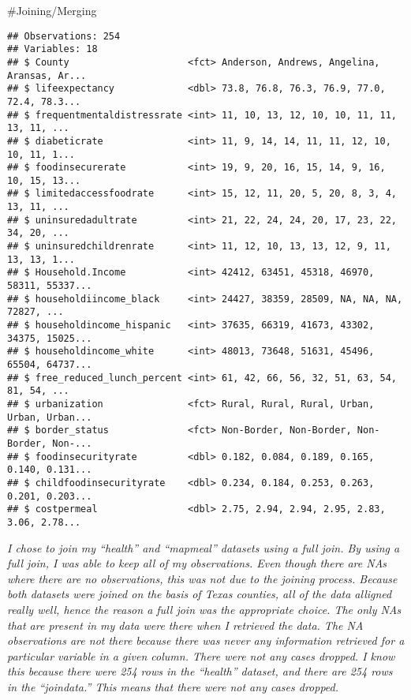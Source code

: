 \documentclass[]{article}
\newenvironment{Shaded}{\begin{snugshade}}{\end{snugshade}}
\newcommand{\DataTypeTok}[1]{\textcolor[rgb]{0.13,0.29,0.53}{#1}}
\newcommand{\KeywordTok}[1]{\textcolor[rgb]{0.13,0.29,0.53}{\textbf{#1}}}
\newcommand{\NormalTok}[1]{#1}
\newcommand{\OperatorTok}[1]{\textcolor[rgb]{0.81,0.36,0.00}{\textbf{#1}}}
\newcommand{\StringTok}[1]{\textcolor[rgb]{0.31,0.60,0.02}{#1}}
\begin{document}
\#Joining/Merging

\begin{Shaded}
\end{Shaded}

\begin{verbatim}
## Observations: 254
## Variables: 18
## $ County                     <fct> Anderson, Andrews, Angelina, Aransas, Ar...
## $ lifeexpectancy             <dbl> 73.8, 76.8, 76.3, 76.9, 77.0, 72.4, 78.3...
## $ frequentmentaldistressrate <int> 11, 10, 13, 12, 10, 10, 11, 11, 13, 11, ...
## $ diabeticrate               <int> 11, 9, 14, 14, 11, 11, 12, 10, 10, 11, 1...
## $ foodinsecurerate           <int> 19, 9, 20, 16, 15, 14, 9, 16, 10, 15, 13...
## $ limitedaccessfoodrate      <int> 15, 12, 11, 20, 5, 20, 8, 3, 4, 13, 11, ...
## $ uninsuredadultrate         <int> 21, 22, 24, 24, 20, 17, 23, 22, 34, 20, ...
## $ uninsuredchildrenrate      <int> 11, 12, 10, 13, 13, 12, 9, 11, 13, 13, 1...
## $ Household.Income           <int> 42412, 63451, 45318, 46970, 58311, 55337...
## $ householdiincome_black     <int> 24427, 38359, 28509, NA, NA, NA, 72827, ...
## $ householdincome_hispanic   <int> 37635, 66319, 41673, 43302, 34375, 15025...
## $ householdincome_white      <int> 48013, 73648, 51631, 45496, 65504, 64737...
## $ free_reduced_lunch_percent <int> 61, 42, 66, 56, 32, 51, 63, 54, 81, 54, ...
## $ urbanization               <fct> Rural, Rural, Rural, Urban, Urban, Urban...
## $ border_status              <fct> Non-Border, Non-Border, Non-Border, Non-...
## $ foodinsecurityrate         <dbl> 0.182, 0.084, 0.189, 0.165, 0.140, 0.131...
## $ childfoodinsecurityrate    <dbl> 0.234, 0.184, 0.253, 0.263, 0.201, 0.203...
## $ costpermeal                <dbl> 2.75, 2.94, 2.94, 2.95, 2.83, 3.06, 2.78...
\end{verbatim}

\emph{I chose to join my ``health'' and ``mapmeal'' datasets using a
full join. By using a full join, I was able to keep all of my
observations. Even though there are NAs where there are no observations,
this was not due to the joining process. Because both datasets were
joined on the basis of Texas counties, all of the data alligned really
well, hence the reason a full join was the appropriate choice. The only
NAs that are present in my data were there when I retrieved the data.
The NA observations are not there because there was never any
information retrieved for a particular variable in a given column. There
were not any cases dropped. I know this because there were 254 rows in
the ``health'' dataset, and there are 254 rows in the ``joindata.'' This
means that there were not any cases dropped.}
\end{document}
